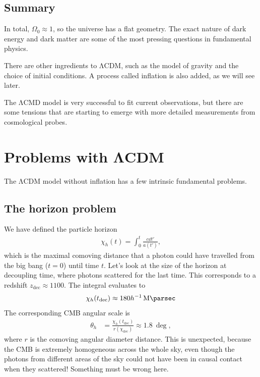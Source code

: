 \subsection*{Summary}
In total, $\Omega_0 \approx 1$, so the universe has a flat geometry. The exact nature of dark energy and dark matter are some of the most pressing questions in fundamental physics.

There are other ingredients to ΛCDM, such as the model of gravity and the choice of initial conditions. A process called inflation is also added, as we will see later.

The ΛCMD model is very successful to fit current observations, but there are some tensions that are starting to emerge with more detailed measurements from cosmological probes.



\section{Problems with ΛCDM}

The ΛCDM model without inflation has a few intrinsic fundamental problems.

\subsection{The horizon problem}
We have defined the particle horizon
\begin{align*}
	\chi_h(t) = \int_0^t \frac{c \dd{t'}}{a(t')},
\end{align*}
which is the maximal comoving distance that a photon could have travelled from the big bang ($t=0$) until time $t$. Let's look at the size of the horizon at decoupling time, where photons scattered for the last time. This corresponds to a redshift $z_\text{dec} \approx 1100$. The integral evaluates to
\begin{align*}
	\chi_h (t_\text{dec}) \approx 180 h^{-1} \, \si{\mega\parsec}
\end{align*}
The corresponding CMB angular scale is
\begin{align*}
	\theta_h
	&= \frac{\chi_h(t_\text{dec})}{r(\chi_\text{dec})} 
	\approx \SI{1.8}{\deg},
\end{align*}
where $r$ is the comoving angular diameter distance.
This is unexpected, because the CMB is extremely homogeneous across the whole sky, even though the photons from different areas of the sky could not have been in causal contact when they scattered! Something must be wrong here.

